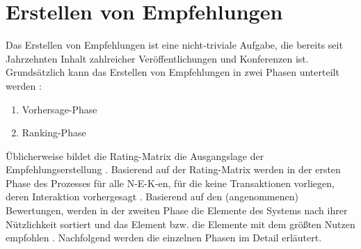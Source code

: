 \section{Erstellen von Empfehlungen}
\label{ch:empfehlungssysteme:empfehlungserstellung}
Das Erstellen von Empfehlungen ist eine nicht-triviale Aufgabe, die bereits seit Jahrzehnten Inhalt zahlreicher Veröffentlichungen und Konferenzen ist.
Grundsätzlich kann das Erstellen von Empfehlungen in zwei Phasen unterteilt werden \cite[S. 405]{unternährer:article}\cite[S. 854]{adomavicius:4:inbook}\cite[S. 898]{adomavicius:article}:
\begin{enumerate}
	\item Vorhersage-Phase
	\item Ranking-Phase
\end{enumerate}

Üblicherweise bildet die Rating-Matrix die Ausgangslage der Empfehlungserstellung \cite[S. 48]{adomavicius:inproceedings:2}.
Basierend auf der Rating-Matrix werden in der ersten Phase des Prozesses für alle \ac{N-E-K}-en, für die keine Transaktionen vorliegen, deren Interaktion vorhergesagt \cite[S. 3]{recommenderSystems:2016}.
Basierend auf den (angenommenen) Bewertungen, werden in der zweiten Phase die Elemente des Systems nach ihrer Nützlichkeit sortiert und das Element bzw. die Elemente mit dem größten Nutzen empfohlen \cite[S. 898]{adomavicius:article}.
Nachfolgend werden die einzelnen Phasen im Detail erläutert.

